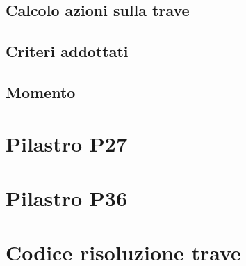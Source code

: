 \section{Calcolo azioni sulla trave}
\section{Criteri addottati}
\section{Momento}
\chapter{Pilastro P27}
\chapter{Pilastro P36}



\appendix
\chapter{Codice risoluzione trave}